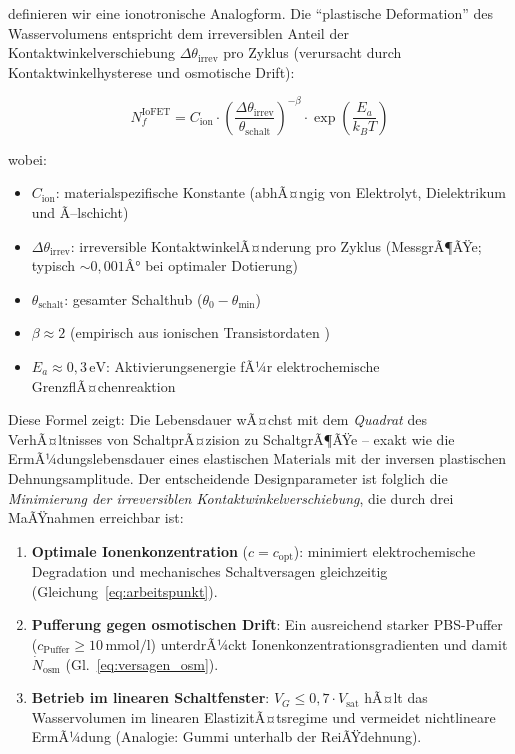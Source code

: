﻿\documentclass[a4paper,12pt]{scrreprt}
\theoremstyle{definition}
\begin{document}
definieren wir eine ionotronische Analogform. Die ``plastische Deformation''
des Wasservolumens entspricht dem irreversiblen Anteil der Kontaktwinkelverschiebung
$\Delta\theta_{\mathrm{irrev}}$ pro Zyklus (verursacht durch Kontaktwinkelhysterese
und osmotische Drift):

\begin{equation}
	\boxed{N_f^{\mathrm{IoFET}} = C_{\mathrm{ion}} \cdot
		\left(\frac{\Delta\theta_{\mathrm{irrev}}}{\theta_{\mathrm{schalt}}}\right)^{-\beta}
		\cdot \exp\!\left(\frac{E_a}{k_B T}\right)}
	\label{eq:lebensdauer_iofet}
\end{equation}

wobei:
\begin{itemize}
	\item $C_{\mathrm{ion}}$: materialspezifische Konstante (abhÃ¤ngig von
	Elektrolyt, Dielektrikum und Ã–lschicht)
	\item $\Delta\theta_{\mathrm{irrev}}$: irreversible KontaktwinkelÃ¤nderung
	pro Zyklus (MessgrÃ¶ÃŸe; typisch $\sim 0{,}001Â°$ bei optimaler Dotierung)
	\item $\theta_{\mathrm{schalt}}$: gesamter Schalthub ($\theta_0 - \theta_{\mathrm{min}}$)
	\item $\beta \approx 2$ (empirisch aus ionischen Transistordaten \cite{xu2021})
	\item $E_a \approx 0{,}3\,\mathrm{eV}$: Aktivierungsenergie fÃ¼r
	elektrochemische GrenzflÃ¤chenreaktion
\end{itemize}

Diese Formel zeigt: Die Lebensdauer wÃ¤chst mit dem \emph{Quadrat} des
VerhÃ¤ltnisses von SchaltprÃ¤zision zu SchaltgrÃ¶ÃŸe -- exakt wie die
ErmÃ¼dungslebensdauer eines elastischen Materials mit der inversen plastischen
Dehnungsamplitude. Der entscheidende Designparameter ist folglich die
\emph{Minimierung der irreversiblen Kontaktwinkelverschiebung}, die durch
drei MaÃŸnahmen erreichbar ist:

\begin{enumerate}
	\item \textbf{Optimale Ionenkonzentration} ($c = c_{\mathrm{opt}}$):
	minimiert elektrochemische Degradation und mechanisches Schaltversagen
	gleichzeitig (Gleichung~\eqref{eq:arbeitspunkt}).
	
	\item \textbf{Pufferung gegen osmotischen Drift}:
	Ein ausreichend starker PBS-Puffer ($c_{\mathrm{Puffer}} \geq 10\,\mathrm{mmol/l}$)
	unterdrÃ¼ckt Ionenkonzentrationsgradienten und damit
	$\dot{N}_{\mathrm{osm}}$ (Gl.~\eqref{eq:versagen_osm}).
	
	\item \textbf{Betrieb im linearen Schaltfenster}:
	$V_G \leq 0{,}7 \cdot V_{\mathrm{sat}}$ hÃ¤lt das Wasservolumen im
	linearen ElastizitÃ¤tsregime und vermeidet nichtlineare ErmÃ¼dung
	(Analogie: Gummi unterhalb der ReiÃŸdehnung).
\end{enumerate}
\end{document}
